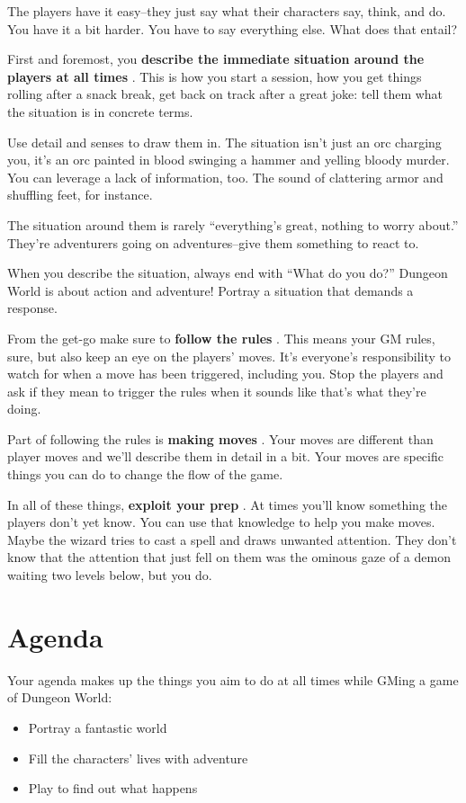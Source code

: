  The players have it easy--they just say what their characters say, think, and do. You have it a bit harder. You have to say everything else. What does that entail?


 First and foremost, you \textbf{describe the immediate situation around the players at all times}
. This is how you start a session, how you get things rolling after a snack break, get back on track after a great joke: tell them what the situation is in concrete terms.


 Use detail and senses to draw them in. The situation isn't just an orc charging you, it's an orc painted in blood swinging a hammer and yelling bloody murder. You can leverage a lack of information, too. The sound of clattering armor and shuffling feet, for instance.


 The situation around them is rarely ``everything's great, nothing to worry about.'' They're adventurers going on adventures--give them something to react to.


 When you describe the situation, always end with ``What do you do?'' Dungeon World is about action and adventure! Portray a situation that demands a response.


 From the get-go make sure to \textbf{follow the rules}
. This means your GM rules, sure, but also keep an eye on the players' moves. It's everyone's responsibility to watch for when a move has been triggered, including you. Stop the players and ask if they mean to trigger the rules when it sounds like that's what they're doing.


 Part of following the rules is \textbf{making moves}
. Your moves are different than player moves and we'll describe them in detail in a bit. Your moves are specific things you can do to change the flow of the game.


 In all of these things, \textbf{exploit your prep}
. At times you'll know something the players don't yet know. You can use that knowledge to help you make moves. Maybe the wizard tries to cast a spell and draws unwanted attention. They don't know that the attention that just fell on them was the ominous gaze of a demon waiting two levels below, but you do. 
\section{Agenda}


 Your agenda makes up the things you aim to do at all times while GMing a game of Dungeon World:
\begin{itemize}
\item Portray a fantastic world
\item Fill the characters' lives with adventure
\item Play to find out what happens

\end{itemize}


